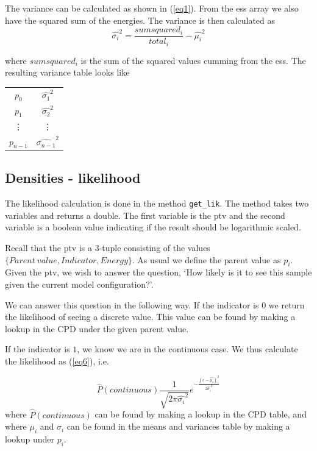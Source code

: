 \documentclass[10pt, journal, compsoc, a4paper]{IEEEtran}
\begin{document}
The variance can be calculated as shown in (\ref{eq1}). From the ess array we also have the squared sum of the energies. The variance is then calculated as
\begin{equation}
  \hat{\sigma_i}^2 = \frac{sumsquared_i}{total_i} - \hat{\mu_i}^2
\end{equation}

where $sumsquared_i$ is the sum of the squared values cumming from the ess. The resulting variance table looks like
\begin{center}
  \begin{tabular}{c | c }
  $p_0$ & $\hat{\sigma_1}^2$ \\
  $p_1$ & $\hat{\sigma_2}^2$ \\
  \vdots & \vdots \\
  $p_{n-1}$ & $\hat{\sigma_{n-1}}^2$  
  \end{tabular}  
\end{center}


\subsection{Densities - likelihood} %
\label{sub:densities_likelihood}
The likelihood calculation is done in the method \texttt{get\_lik}. The method takes two variables and returns a double. The first variable is the ptv and the second variable is a boolean value indicating if the result should be logarithmic scaled.

Recall that the ptv is a 3-tuple consisting of the values $\{Parent\ value, Indicator, Energy\}$. As usual we define the parent value as $p_i$. Given the ptv, we wish to answer the question, `How likely is it to see this sample given the current model configuration?'. 

We can answer this question in the following way.  If the indicator is $0$ we return the likelihood of seeing a discrete value. This value can be found by making a lookup in the CPD under the given parent value. 

If the indicator is $1$, we know we are in the continuous case. We thus calculate the likelihood as (\ref{eq6}), i.e.

\begin{equation}
  \hat{P}(continuous) \frac{1}{\sqrt{2\pi\hat{\sigma_i}^2}} e^{ -\frac{(e-\hat{\mu_i})^2}{2\hat{\sigma_i}^2} }
  \label{eq20}
\end{equation}
where $\hat{P}(continuous)$ can be found by making a lookup in the CPD table, and where $\mu_i$ and $\sigma_i$ can be found in the means and variances table by making a lookup under $p_i$.
\end{document}
